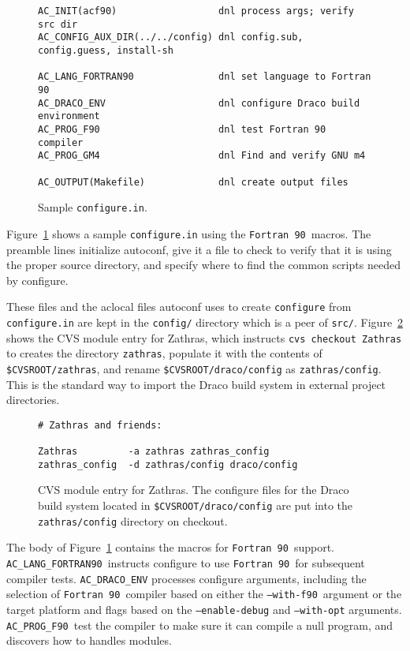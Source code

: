 \documentclass[11pt]{nmemo}
\newcommand{\fninety}{\texttt{Fortran~90}}
\newcommand{\withfninety}{\texttt{--with-f90}}
\newcommand{\langfninety}{\texttt{AC\_LANG\_FORTRAN90}}
\newcommand{\progfninety}{\texttt{AC\_PROG\_F90}}
\begin{document}
\begin{figure}[hbt]
\hrulefill
\begin{verbatim}
AC_INIT(acf90)                  dnl process args; verify src dir
AC_CONFIG_AUX_DIR(../../config) dnl config.sub, config.guess, install-sh

AC_LANG_FORTRAN90               dnl set language to Fortran 90
AC_DRACO_ENV                    dnl configure Draco build environment
AC_PROG_F90                     dnl test Fortran 90 compiler
AC_PROG_GM4                     dnl Find and verify GNU m4

AC_OUTPUT(Makefile)             dnl create output files
\end{verbatim}
\caption{Sample \texttt{configure.in}.}\label{fig:configure}
\hrulefill
\end{figure}

Figure~\ref{fig:configure} shows a sample \texttt{configure.in} using
the \fninety\ macros.  The preamble lines initialize autoconf, give it
a file to check to verify that it is using the proper source
directory, and specify where to find the common scripts needed by
configure.  

These files and the aclocal files autoconf uses to create
\texttt{configure} from \texttt{configure.in} are kept in the
\texttt{config/} directory which is a peer of \texttt{src/}.
Figure~\ref{fig:zathras} shows the CVS module entry for Zathras, which
instructs \texttt{cvs checkout Zathras} to creates the directory
\texttt{zathras}, populate it with the contents of
\texttt{\$CVSROOT/zathras}, and rename \texttt{\$CVSROOT/draco/config}
as \texttt{zathras/config}.  This is the standard way to import the
Draco build system in external project directories.
\begin{figure}[hbt]
\hrulefill
\begin{verbatim}
# Zathras and friends:

Zathras         -a zathras zathras_config
zathras_config  -d zathras/config draco/config
\end{verbatim}
\caption{CVS module entry for Zathras.  The configure files for the
Draco build system located in \texttt{\$CVSROOT/draco/config} are put
into the \texttt{zathras/config} directory on
checkout.}\label{fig:zathras}
\hrulefill
\end{figure}

The body of Figure~\ref{fig:configure} contains the macros for
\fninety\ support.  \langfninety\ instructs configure to use \fninety\
for subsequent compiler tests.  \texttt{AC\_DRACO\_ENV} processes
configure arguments, including the selection of \fninety\ compiler
based on either the \withfninety\ argument or the target platform and
flags based on the \texttt{--enable-debug} and \texttt{--with-opt}
arguments.  \progfninety\ test the compiler to make sure it can
compile a null program, and discovers how to handles modules.
\end{document}
